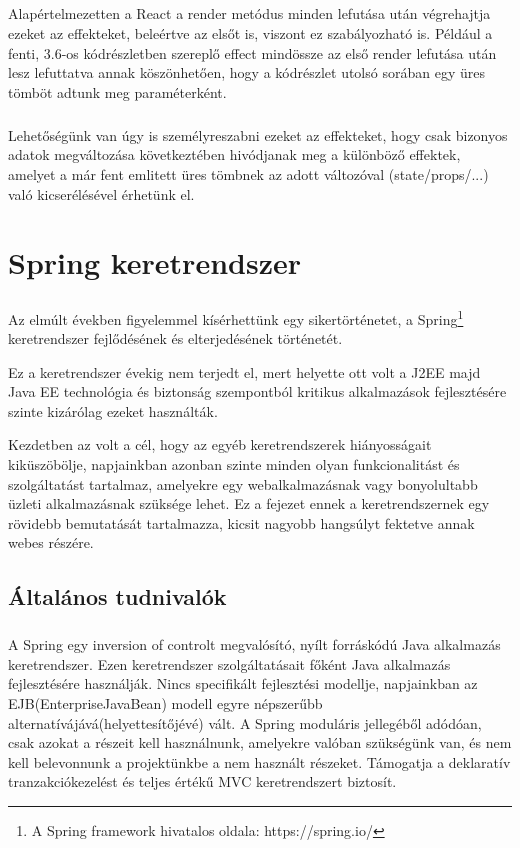\paragraph{}
Alapértelmezetten a React a render metódus minden lefutása után végrehajtja ezeket az effekteket, beleértve az elsőt is, viszont ez szabályozható is. Például a fenti, 3.6-os kódrészletben szereplő effect mindössze az első render lefutása után lesz lefuttatva annak köszönhetően, hogy a kódrészlet utolsó sorában egy üres tömböt adtunk meg paraméterként.

\paragraph{}
Lehetőségünk van úgy is személyreszabni ezeket az effekteket, hogy csak bizonyos adatok megváltozása következtében hivódjanak meg a különböző effektek, amelyet a már fent emlitett üres tömbnek az adott változóval (state/props/...) való kicserélésével érhetünk el.

\chapter{Spring keretrendszer}\label{ch:progik}
\paragraph{}
Az elmúlt években figyelemmel kísérhettünk egy sikertörténetet, a Spring\footnote{A Spring framework hivatalos oldala: https://spring.io/} keretrendszer fejlődésének és elterjedésének történetét. 

Ez a keretrendszer évekig nem terjedt el, mert helyette ott volt a J2EE majd Java EE technológia és biztonság szempontból kritikus alkalmazások fejlesztésére szinte kizárólag ezeket használták. 

Kezdetben az volt a cél, hogy az egyéb keretrendszerek hiányosságait kiküszöbölje, napjainkban azonban szinte minden olyan funkcionalitást és szolgáltatást tartalmaz, amelyekre egy webalkalmazásnak vagy bonyolultabb üzleti alkalmazásnak szüksége lehet. Ez a fejezet ennek a keretrendszernek egy rövidebb bemutatását tartalmazza, kicsit nagyobb hangsúlyt fektetve annak webes részére.

\section{Általános tudnivalók}
\paragraph{}
A Spring egy inversion of controlt megvalósító, nyílt forráskódú Java alkalmazás keretrendszer. Ezen keretrendszer szolgáltatásait főként Java alkalmazás fejlesztésére használják. Nincs specifikált fejlesztési modellje, napjainkban az EJB(EnterpriseJavaBean) modell egyre népszerűbb alternatívájává(helyettesítőjévé) vált. A Spring moduláris jellegéből adódóan, csak azokat a részeit kell használnunk, amelyekre valóban szükségünk van, és nem kell belevonnunk a projektünkbe a nem használt részeket. Támogatja a deklaratív tranzakciókezelést és teljes értékű MVC keretrendszert biztosít.

